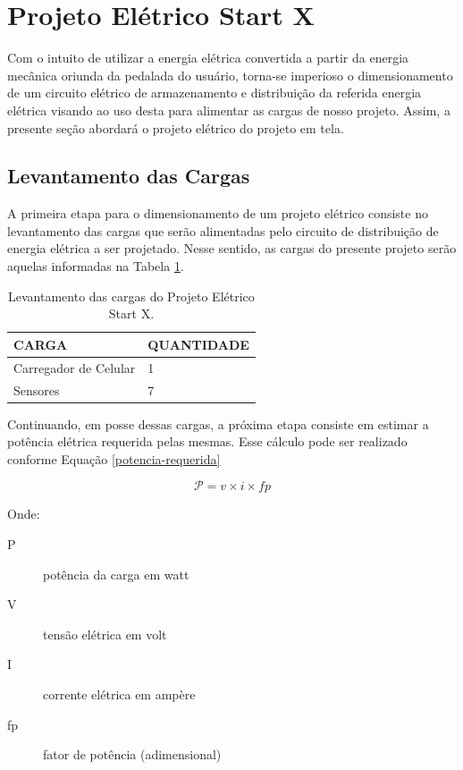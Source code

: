 \section{Projeto Elétrico Start X}

Com o intuito de utilizar a energia elétrica convertida a partir da energia mecânica oriunda da pedalada do usuário, torna-se imperioso o dimensionamento de um circuito elétrico de armazenamento e distribuição da referida energia elétrica visando ao uso desta para alimentar as cargas de nosso projeto. Assim, a presente seção abordará o projeto elétrico do projeto em tela.

\subsection{Levantamento das Cargas}
\label{levantamento-cargas}

A primeira etapa para o dimensionamento de um projeto elétrico consiste no levantamento das cargas que serão alimentadas pelo circuito de distribuição de energia elétrica a ser projetado. Nesse sentido, as cargas do presente projeto serão aquelas informadas na Tabela \ref{cargas-dispositivos}.

\begin{table}[h]
\centering
\begin{tabular}{|l|l|}
\hline
\rowcolor[HTML]{329A9D} 
CARGA                                                           & QUANTIDADE \\ \hline
Carregador de Celular & 1          \\ \hline
Sensores                                                        & 7          \\ \hline
\end{tabular}
\caption{Levantamento das cargas do Projeto Elétrico Start X.}
\label{cargas-dispositivos}
\end{table}

Continuando, em posse dessas cargas, a próxima etapa consiste em estimar a potência elétrica requerida pelas mesmas. Esse cálculo pode ser realizado conforme Equação \ref{potencia-requerida}

\begin{equation}
	\mathcal{P} = v \times i \times fp
	\label{potencia-requerida}
\end{equation}

Onde:
\begin{description}

\item [P] potência da carga em watt

\item [V] tensão elétrica em volt

\item [I] corrente elétrica em ampère

\item [fp] fator de potência (adimensional)
\end{description}

